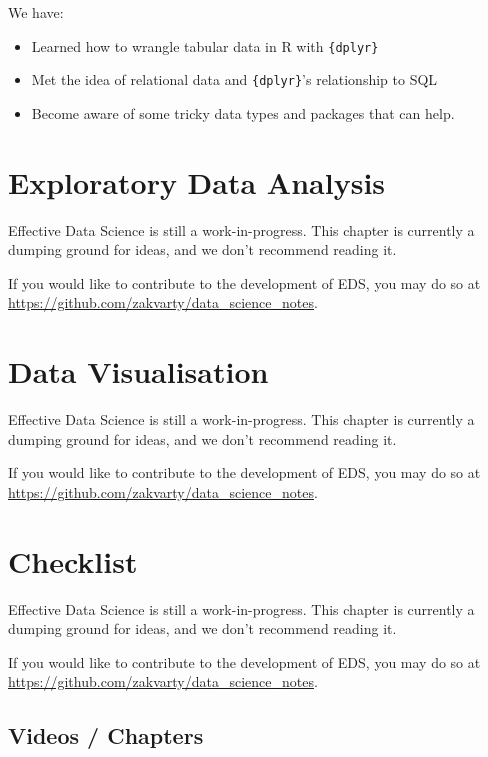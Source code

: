 \documentclass[
  12pt,
]{book}
\begin{document}
We have:

\begin{itemize}
\item
  Learned how to wrangle tabular data in R with \texttt{\{dplyr\}}
\item
  Met the idea of relational data and \texttt{\{dplyr\}}'s relationship to SQL
\item
  Become aware of some tricky data types and packages that can help.
\end{itemize}

\hypertarget{edav-analysis}{%
\chapter{Exploratory Data Analysis}\label{edav-analysis}}

Effective Data Science is still a work-in-progress. This chapter is currently a dumping ground for ideas, and we don't recommend reading it.

If you would like to contribute to the development of EDS, you may do so at \url{https://github.com/zakvarty/data_science_notes}.

\hypertarget{edav-visualisation}{%
\chapter{Data Visualisation}\label{edav-visualisation}}

Effective Data Science is still a work-in-progress. This chapter is currently a dumping ground for ideas, and we don't recommend reading it.

If you would like to contribute to the development of EDS, you may do so at \url{https://github.com/zakvarty/data_science_notes}.

\hypertarget{edav-checklist}{%
\chapter*{Checklist}\label{edav-checklist}}

Effective Data Science is still a work-in-progress. This chapter is currently a dumping ground for ideas, and we don't recommend reading it.

If you would like to contribute to the development of EDS, you may do so at \url{https://github.com/zakvarty/data_science_notes}.

\hypertarget{videos-chapters-2}{%
\section{Videos / Chapters}\label{videos-chapters-2}}
\end{document}
